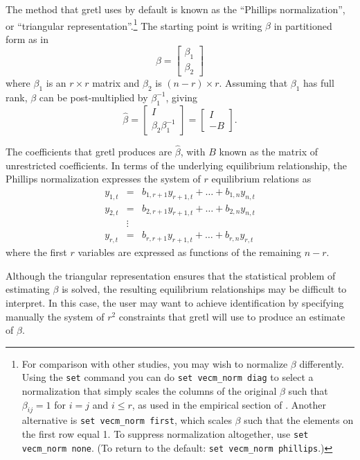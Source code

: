 The method that gretl uses by default is known as the ``Phillips
normalization'', or ``triangular representation''.\footnote{For
  comparison with other studies, you may wish to normalize $\beta$
  differently.  Using the \texttt{set} command you can do
  \verb|set vecm_norm diag| to select a normalization that simply
  scales the columns of the original $\beta$ such that $\beta_{ij} =
  1$ for $i=j$ and $i \leq r$, as used in the empirical section of
  \cite{boswijk-doornik04}.  Another alternative is
  \verb+set vecm_norm first+, which scales $\beta$ such that the
  elements on the first row equal 1.  To suppress normalization
  altogether, use \verb+set vecm_norm none+.  (To return to the
  default: \texttt{set vecm\_norm phillips}.)} The starting point is
writing $\beta$ in partitioned form as in
\[
  \beta = \left[
    \begin{array}{c} \beta_1 \\ \beta_2  \end{array}
    \right]
\]
where $\beta_1$ is an $r \times r$ matrix and  $\beta_2$ is $(n-r)
\times r$. Assuming that $\beta_1$ has full rank, $\beta$ can be
post-multiplied by $\beta_1^{-1}$, giving
\[
  \hat{\beta} = \left[
    \begin{array}{c} I \\ \beta_2 \beta_1^{-1}  \end{array}
    \right] =
    \left[
    \begin{array}{c} I \\ -B \end{array}
  \right].
\]

The coefficients that gretl produces are $\hat{\beta}$, with
$B$ known as the matrix of unrestricted coefficients. In
terms of the underlying equilibrium relationship, the Phillips
normalization expresses the system of $r$ equilibrium relations as
  \begin{eqnarray*}
    y_{1,t} & = & b_{1,r+1} y_{r+1,t} + \ldots + b_{1,n} y_{n,t} \\
    y_{2,t} & = & b_{2,r+1} y_{r+1,t} + \ldots + b_{2,n} y_{n,t} \\
    & \vdots & \\
    y_{r,t} & = & b_{r,r+1} y_{r+1,t} + \ldots + b_{r,n} y_{r,t} 
  \end{eqnarray*}
where the first $r$ variables are expressed as functions of the
remaining $n-r$.

Although the triangular representation ensures that the statistical
problem of estimating $\beta$ is solved, the resulting equilibrium
relationships may be difficult to interpret. In this case, the user
may want to achieve identification by specifying manually the system
of $r^2$ constraints that gretl will use to produce an estimate
of $\beta$.

